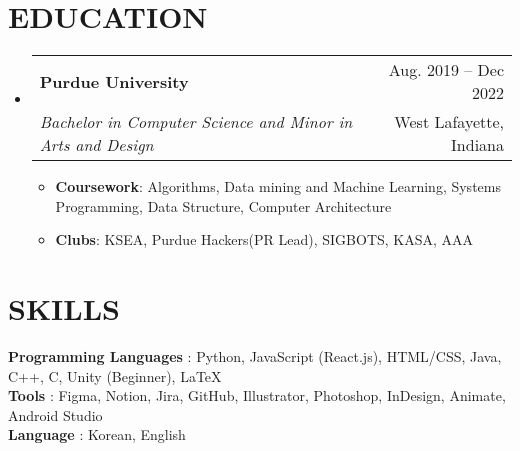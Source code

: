 \documentclass[letterpaper,11pt]{article}
\makeatletter
\newcommand{\resumeItem}[1]{
  \item\small{
    {#1 \vspace{-1pt}}
  }
}
\newcommand{\resumeSubheading}[4]{
  \vspace{-1pt}\item
    \begin{tabular*}{\textwidth}[t]{l@{\extracolsep{\fill}}r}
      \textbf{#1} & {\color{dark-grey}\small #2}\vspace{1pt}\\ %
      \textit{#3} & {\color{dark-grey} \small #4}\\ %
    \end{tabular*}\vspace{-4pt}
}
\newcommand{\resumeSubHeadingListStart}{\begin{itemize}[leftmargin=0in, label={}]}
\newcommand{\resumeSubHeadingListEnd}{\end{itemize}}
\newcommand{\resumeItemListStart}{\begin{itemize}}
\newcommand{\resumeItemListEnd}{\end{itemize}\vspace{0pt}}
\makeatother
\begin{document}
    \resumeProjectHeadingListEnd



\section {EDUCATION}
  \resumeSubHeadingListStart
    \resumeSubheading
      {Purdue University}{Aug. 2019 -- Dec 2022}
      {Bachelor in Computer Science and Minor in Arts and Design}{West Lafayette, Indiana}
      	\resumeItemListStart
    	\resumeItem {\textbf{Coursework}: Algorithms, Data mining and Machine Learning, Systems Programming, Data Structure, Computer Architecture}
        \resumeItem 
            {\textbf{Clubs}: KSEA, Purdue Hackers(PR Lead), SIGBOTS, KASA, AAA}
        \resumeItemListEnd
  \resumeSubHeadingListEnd


%
\section{SKILLS}
 \begin{itemize}[leftmargin=0in, label={}]
    \small{\item{
     \textbf{Programming Languages} {: Python, JavaScript (React.js), HTML/CSS, Java, C++, C, Unity (Beginner), LaTeX}\vspace{2pt} \\
     \textbf{Tools}     {: Figma, Notion, Jira, GitHub, Illustrator, Photoshop, InDesign, Animate, Android Studio}\vspace{2pt} \\
     \textbf{Language}     {: Korean, English}
    }}
 \end{itemize}


\end{document}

